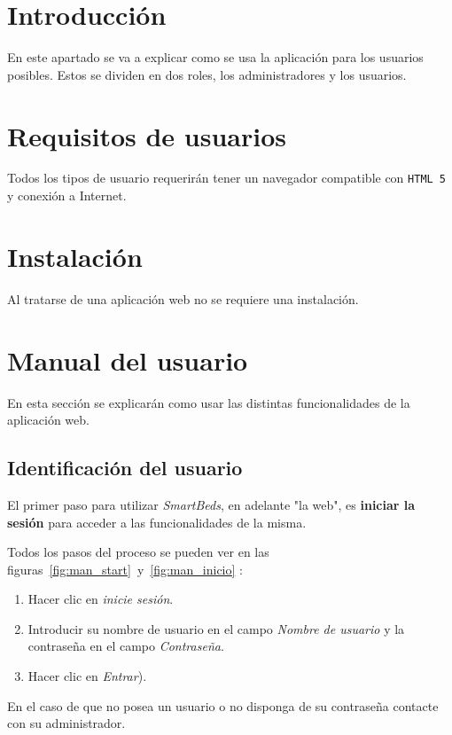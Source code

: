 
\section{Introducción}

En este apartado se va a explicar como se usa la aplicación para los usuarios posibles. Estos se dividen en dos roles, los administradores y los usuarios.

\section{Requisitos de usuarios}

Todos los tipos de usuario requerirán tener un navegador compatible con \texttt{HTML 5} y conexión a Internet.

\section{Instalación}

Al tratarse de una aplicación web no se requiere una instalación.

\section{Manual del usuario}

En esta sección se explicarán como usar las distintas funcionalidades de la aplicación web.

\subsection{Identificación del usuario}

El primer paso para utilizar \textit{SmartBeds}, en adelante "la web", es \textbf{iniciar la sesión} para acceder a las funcionalidades de la misma. 

Todos los pasos del proceso se pueden ver en las figuras~\ref{fig:man_start}~y~\ref{fig:man_inicio} :
\begin{enumerate}
	\item Hacer clic en \textit{inicie sesión}.
	\item Introducir su nombre de usuario en el campo \textit{Nombre de usuario} y la contraseña en el campo \textit{Contraseña}.
	\item Hacer clic en \textit{Entrar}).
\end{enumerate} 

En el caso de que no posea un usuario o no disponga de su contraseña contacte con su administrador.

